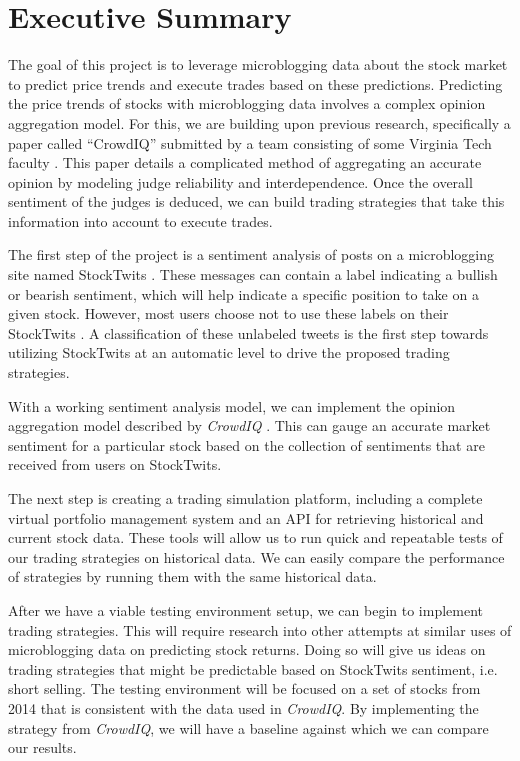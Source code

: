 
\section{Executive Summary}

The goal of this project is to leverage microblogging data about the stock market to predict price trends and execute trades based on these predictions.
Predicting the price trends of stocks with microblogging data involves a complex opinion aggregation model.
For this, we are building upon previous research, specifically a paper called ``CrowdIQ'' submitted by a team consisting of some Virginia Tech faculty \cite{crowdiq}.
This paper details a complicated method of aggregating an accurate opinion by modeling judge reliability and interdependence.
Once the overall sentiment of the judges is deduced, we can build trading strategies that take this information into account to execute trades.

The first step of the project is a sentiment analysis of posts on a microblogging site named StockTwits \cite{stocktwits}.
These messages can contain a label indicating a bullish or bearish sentiment, which will help indicate a specific position to take on a given stock.
However, most users choose not to use these labels on their StockTwits \cite{crowdiq}.
A classification of these unlabeled tweets is the first step towards utilizing StockTwits at an automatic level to drive the proposed trading strategies.

With a working sentiment analysis model, we can implement the opinion aggregation model described by \textit{CrowdIQ} \cite{crowdiq}.
This can gauge an accurate market sentiment for a particular stock based on the collection of sentiments that are received from users on StockTwits.

The next step is creating a trading simulation platform, including a complete virtual portfolio management system and an API for retrieving historical and current stock data.
These tools will allow us to run quick and repeatable tests of our trading strategies on historical data.
We can easily compare the performance of strategies by running them with the same historical data.

After we have a viable testing environment setup, we can begin to implement trading strategies.
This will require research into other attempts at similar uses of microblogging data on predicting stock returns.
Doing so will give us ideas on trading strategies that might be predictable based on StockTwits sentiment, i.e. short selling.
The testing environment will be focused on a set of stocks from 2014 that is consistent with the data used in \textit{CrowdIQ}.
By implementing the strategy from \textit{CrowdIQ}, we will have a baseline against which we can compare our results.

